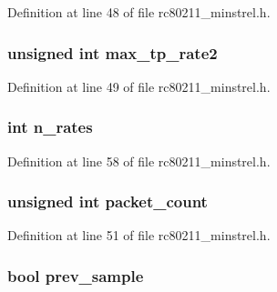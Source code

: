 Definition at line 48 of file rc80211\-\_\-minstrel.\-h.

\hypertarget{structminstrel__sta__info_aaa4f3e0147c91173f7dd6d86b82ba0ee}{
\subsubsection[{max\-\_\-tp\-\_\-rate2}]{\setlength{\rightskip}{0pt plus 5cm}unsigned int max\-\_\-tp\-\_\-rate2}}\label{structminstrel__sta__info_aaa4f3e0147c91173f7dd6d86b82ba0ee}


Definition at line 49 of file rc80211\-\_\-minstrel.\-h.

\hypertarget{structminstrel__sta__info_abea138d7b28f0fb6b6877d27555ed046}{
\subsubsection[{n\-\_\-rates}]{\setlength{\rightskip}{0pt plus 5cm}int n\-\_\-rates}}\label{structminstrel__sta__info_abea138d7b28f0fb6b6877d27555ed046}


Definition at line 58 of file rc80211\-\_\-minstrel.\-h.

\hypertarget{structminstrel__sta__info_af0a068e62b23d45baeffebf5250afd21}{
\subsubsection[{packet\-\_\-count}]{\setlength{\rightskip}{0pt plus 5cm}unsigned int packet\-\_\-count}}\label{structminstrel__sta__info_af0a068e62b23d45baeffebf5250afd21}


Definition at line 51 of file rc80211\-\_\-minstrel.\-h.

\hypertarget{structminstrel__sta__info_a5cd8f1c60ce3302d16a34887cb5cc2ea}{
\subsubsection[{prev\-\_\-sample}]{\setlength{\rightskip}{0pt plus 5cm}bool prev\-\_\-sample}}\label{structminstrel__sta__info_a5cd8f1c60ce3302d16a34887cb5cc2ea}


